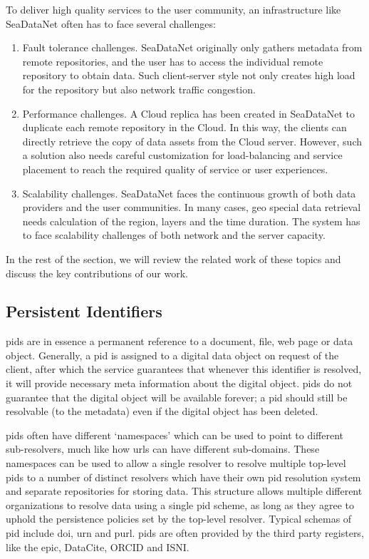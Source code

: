 \documentclass[conference]{IEEEtran}
\begin{document}
To deliver high quality services to the user community, an infrastructure like SeaDataNet often has to face several challenges:
\begin{enumerate}
    \item Fault tolerance challenges. SeaDataNet originally only gathers metadata from remote repositories, and the user has to access the individual remote repository to obtain data. Such client-server style not only creates high load for the repository but also network traffic congestion.
    \item Performance challenges. A Cloud replica has been created in SeaDataNet to duplicate each remote repository in the Cloud. In this way, the clients can directly retrieve the copy of data assets from the Cloud server. However, such a solution also needs careful customization for load-balancing and service placement to reach the required quality of service or user experiences.
    \item Scalability challenges. SeaDataNet faces the continuous growth of both data providers and the user communities. In many cases, geo special data retrieval needs calculation of the region, layers and the time duration. The system has to face scalability challenges of both network and the server capacity. 
\end{enumerate}
In the rest of the section, we will review the related work of these topics and discuss the key contributions of our work. 

\subsection{Persistent Identifiers}
\label{sec:pids}

\glspl{pid} are in essence a permanent reference to a document, file, web page or data object. Generally, a \gls{pid} is assigned to a digital data object on request of the client, after which the service guarantees that whenever this identifier is resolved, it will provide necessary meta information about the digital object. \glspl{pid} do not guarantee that the digital object will be available forever; a \gls{pid} should still be resolvable (to the metadata) even if the digital object has been deleted. 

\glspl{pid} often have different `namespaces' which can be used to point to different sub-resolvers, much like how \glspl{url} can have different sub-domains. These namespaces can be used to allow a single resolver to resolve multiple top-level \glspl{pid} to a number of distinct resolvers which have their own \gls{pid} resolution system and separate repositories for storing data. This structure allows multiple different organizations to resolve data using a single \gls{pid} scheme, as long as they agree to uphold the persistence policies set by the top-level resolver. Typical schemas of \gls{pid} include \gls{doi}, \gls{urn} and \gls{purl}. \glspl{pid} are often provided by the third party registers, like the \gls{epic}, DataCite, ORCID and ISNI. 
\end{document}
